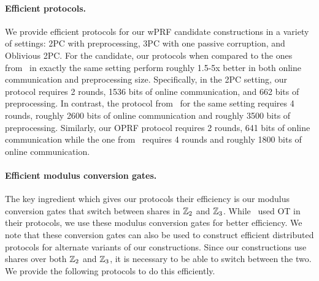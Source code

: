 \paragraph{Efficient protocols.} 
We provide efficient protocols for our wPRF candidate constructions in a variety of settings: 2PC with preprocessing, 3PC with one passive corruption, and Oblivious 2PC. For the \ttwPRF candidate, our protocols when compared to the ones from~\cite{boneh2018-darkmatter} in exactly the same setting perform roughly 1.5-5x better in both online communication and preprocessing size. Specifically, in the 2PC setting, our protocol requires 2 rounds, 1536 bits of online communication, and 662 bits of preprocessing. In contrast, the protocol from~\cite{boneh2018-darkmatter} for the same setting requires 4 rounds, roughly 2600 bits of online communication and roughly 3500 bits of preprocessing. Similarly, our OPRF protocol requires 2 rounds, 641 bits of online communication while the one from~\cite{boneh2018-darkmatter} requires 4 rounds and roughly 1800 bits of online communication.

\paragraph{Efficient modulus conversion gates.}
The key ingredient which gives our protocols their efficiency is our modulus conversion gates that switch between shares in $\mathbb{Z}_2$ and $\mathbb{Z}_3$. While~\cite{boneh2018-darkmatter} used OT in their protocols, we use these modulus conversion gates for better efficiency. We note that these conversion gates can also be used to construct efficient distributed protocols for alternate variants of our constructions.
Since our constructions use shares over both $\mathbb{Z}_2$ and $\mathbb{Z}_3$, it is necessary to be able to switch between the two. We provide the following protocols to do this efficiently.  

